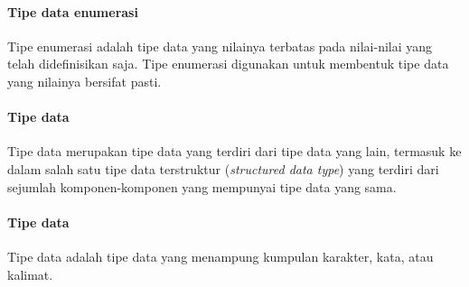\documentclass[../main.tex]{subfiles}
\begin{document}
\paragraph{Tipe data enumerasi}
\begin{indentpar}[n]\hpar{}
    Tipe enumerasi adalah tipe data yang nilainya terbatas pada nilai-nilai yang telah didefinisikan saja. Tipe enumerasi digunakan untuk membentuk tipe data yang nilainya bersifat pasti.
\end{indentpar}

\paragraph{Tipe data {\sarray}}
\begin{indentpar}[n]\hpar{}
    Tipe data {\sarray} merupakan tipe data yang terdiri dari tipe data yang lain, termasuk ke dalam salah satu tipe data terstruktur (\textit{structured data type}) yang terdiri dari sejumlah komponen-komponen yang mempunyai tipe data yang sama.
\end{indentpar}

\paragraph{Tipe data {\sstring}}
\begin{indentpar}[n]\hpar{}
    Tipe data {\sstring} adalah tipe data yang menampung kumpulan karakter, kata, atau kalimat.
\end{indentpar}
\end{document}
